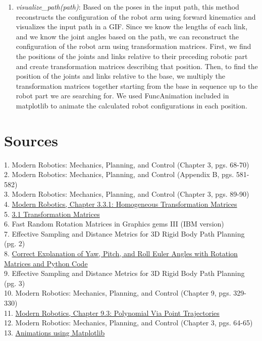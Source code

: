 \documentclass{article}
\begin{document}
\begin{enumerate}
    \item \textit{visualize\_path(path)}:
    Based on the poses in the input path, this method reconstructs the configuration of the robot arm using forward kinematics and visualizes the input path in a GIF.
    Since we know the lengths of each link, and we know the joint angles based on the path, we can reconstruct the configuration of the robot arm using transformation matrices. First, we find the positions of the joints and links relative to their preceding robotic part and create transformation matrices describing that position. Then, to find the position of the joints and links relative to the base, we multiply the transformation matrices together starting from the base in sequence up to the robot part we are searching for.
    We used FuncAnimation included in matplotlib to animate the calculated robot configurations in each position.
    
\end{enumerate}


\section{Sources}
1. Modern Robotics: Mechanics, Planning, and Control (Chapter 3, pgs. 68-70)\\
2. Modern Robotics: Mechanics, Planning, and Control (Appendix B, pgs. 581-582)\\
3. Modern Robotics: Mechanics, Planning, and Control (Chapter 3, pgs. 89-90)\\
4. \href{https://youtu.be/vlb3P7arbkU?si=kdhsJ0rCTVFhPP55}{Modern Robotics, Chapter 3.3.1: Homogeneous Transformation Matrices}\\
5. \href{https://youtu.be/09I15RO49vg?si=3dyr9SLyAj1lEXPi}{3.1 Transformation Matrices}\\
6. Fast Random Rotation Matrices in Graphics gems III (IBM version)\\
7. Effective Sampling and Distance Metrics for 3D Rigid Body Path Planning (pg. 2)\\
8. \href{https://youtu.be/R5CpG1eq5uQ?si=BXiVCW8nhPJsF8zR}{Correct Explanation of Yaw, Pitch, and Roll Euler Angles with Rotation Matrices and Python Code}\\
9. Effective Sampling and Distance Metrics for 3D Rigid Body Path Planning (pg. 3)\\
10. Modern Robotics: Mechanics, Planning, and Control (Chapter 9, pgs. 329-330)\\
11. \href{https://youtu.be/sWPpq9-5YOc?si=QfEqgxXZcyL3Tyw8}{Modern Robotics, Chapter 9.3: Polynomial Via Point Trajectories}\\
12. Modern Robotics: Mechanics, Planning, and Control (Chapter 3, pgs. 64-65)\\
13. \href{https://matplotlib.org/stable/users/explain/animations/animations.html}{Animations using Matplotlib}
\end{document}
